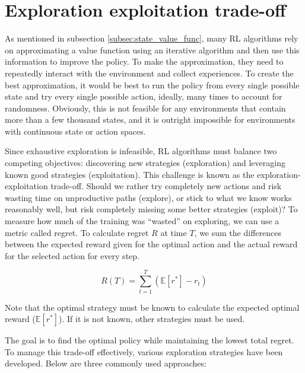 \documentclass[
  digital,     %
  oneside,     %
  nosansbold,  %
  nocolorbold, %
  lof,         %
  lot,         %
]{fithesis4}
\begin{document}
\section{Exploration exploitation trade-off}
As mentioned in subsection \ref{subsec:state_value_func}, many RL algorithms rely on approximating a value function using an iterative algorithm and then use this information to improve the policy. To make the approximation, they need to repeatedly interact with the environment and collect experiences. To create the best approximation, it would be best to run the policy from every single possible state and try every single possible action, ideally, many times to account for randomness. Obviously, this is not feasible for any environments that contain more than a few thousand states, and it is outright impossible for environments with continuous state or action spaces.

Since exhaustive exploration is infeasible, RL algorithms must balance two competing objectives: discovering new strategies (exploration) and leveraging known good strategies (exploitation). This challenge is known as the exploration-exploitation trade-off. Should we rather try completely new actions and risk wasting time on unproductive paths (explore), or stick to what we know works reasonably well, but risk completely missing some better strategies (exploit)? To measure how much of the training was \enquote{wasted} on exploring, we can use a metric called regret. To calculate regret $R$ at time $T$, we sum the differences between the expected reward given for the optimal action and the actual reward for the selected action for every step.

\[
R(T) = \sum_{t=1}^{T}(\mathbb{E}[r^*]-r_t)
\]

Note that the optimal strategy must be known to calculate the expected optimal reward ($\mathbb{E}[r^*]$). If it is not known, other strategies must be used.

The goal is to find the optimal policy while maintaining the lowest total regret. To manage this trade-off effectively, various exploration strategies have been developed. Below are three commonly used approaches:
\end{document}
